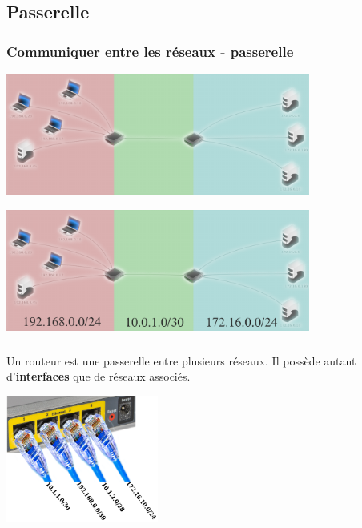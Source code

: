 \documentclass[svgnames,11pt]{beamer}
\begin{document}
\subsection{Passerelle}
\begin{frame}
    \frametitle{Communiquer entre les réseaux - passerelle}

    \begin{center}
        \centering
        \includegraphics[width=10cm]{ressources/deuxreseaux.png}
        \label{IMG}
    \end{center}

\end{frame}
\begin{frame}

    \begin{center}
        \centering
        \includegraphics[width=10cm]{ressources/deuxreseaux2.png}
        \label{IMG}
    \end{center}

\end{frame}
\begin{frame}
    \frametitle{}

    \begin{aretenir}[]
        Un routeur est une passerelle entre plusieurs réseaux. Il possède autant d'\textbf{interfaces} que de réseaux associés.
    \end{aretenir}
    \begin{center}
        \centering
        \includegraphics[width=5cm]{ressources/routeur-adresses.png}
        \label{routeur}
    \end{center}
\end{frame}
\end{document}
